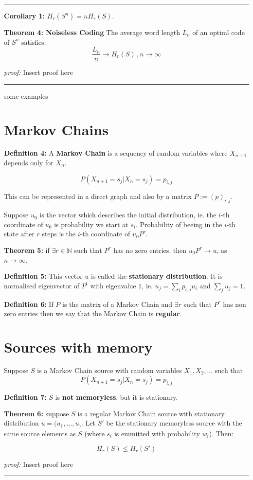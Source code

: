 \documentclass{article}
\begin{document}
\noindent
{\color{gray} \rule{\linewidth}{0.5mm} }

\noindent \textbf{Corollary  1:} $H_{r}(S^n) = n H_{r} (S)$. 


\noindent \textbf{Theorem  4: Noiseless Coding} The average word length $L_n$ of an optiml code of $S^n$ satisfies:
$$
\frac{L_n}{n} \longrightarrow H_{r} (S) \, , n \rightarrow \infty
$$ 
  
\noindent\textit{proof:}  Insert proof here

\noindent
{\color{gray} \rule{\linewidth}{0.5mm} }


some examples

	\section{Markov Chains}
	
\noindent \textbf{Definition 	4:} A \textbf{Markov Chain} is a sequency of random variables where $X_{n + 1}$ depends only for $X_{n}$.

$$
P(X_{n + 1} = s_j | X_{n} = s_j ) = p_{i, j}
$$

\noindent This can be represented in a direct graph and also by a matrix $P := (p)_{i, j}$.

\noindent Suppose $u_0$ is the vector which describes the initial distribution, ie. the $i$-th coordinate of $u_0$ is probability we start at $s_i$. Probability of beeing in the $i$-th state after $r$ steps is the $i$-th coordinate of $u_{0} P^{r}$.

\noindent \textbf{Theorem  5:} if $\exists r \in \mathbb{N}$ such that $P^r$ has no zero entries, then $u_{0} P^{r} \longrightarrow u$, as $n \rightarrow \infty$.

\noindent \textbf{Definition 	5:}  This vector $u$ is called the \textbf{stationary distribution}. It is normalised eigenvector of $P^t$ with eigenvalue $1$, ie. $u_j = \sum_i {p_{i, j} u_i}$ and $\sum_{j} {u_j} = 1$.
 	 
\noindent \textbf{Definition 	6:} If $P$ is the matrix of a Markov Chain and $\exists r$ such that $P^r$ has non zero entries then we say that the Markov Chain is \textbf{regular}.

  
  \section{Sources with memory}
  
Suppose $S$ is a Markov Chain source with random variables $X_1, X_2, ...$ such that
$$
P(X_{n + 1} = s_j | X_{n} = s_j ) = p_{i, j}
$$

\noindent \textbf{Definition 	7:} $S$ is \textbf{not memoryless}, but it is stationary.

 \noindent \textbf{Theorem  6:} suppose $S$ is a regular Markov Chain source with stationary distribution $u = (u_1, ..., u_)$. Let $S'$ be the stationary memoryless source with the same source elements as $S$ (where $s_i$ is emmitted with probability $w_i$). Then:
 
 $$
 H_{r} (S) \leq H_{r} (S')
 $$
 
 \noindent\textit{proof:}  Insert proof here

\noindent
{\color{gray} \rule{\linewidth}{0.5mm} }
\end{document}

